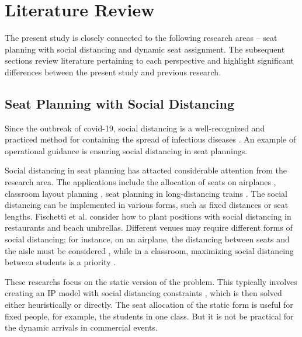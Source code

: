 \section{Literature Review}

The present study is closely connected to the following research areas -- seat planning with social distancing and dynamic seat assignment. The subsequent sections review literature pertaining to each perspective and highlight significant differences between the present study and previous research.


\subsection{Seat Planning with Social Distancing}
Since the outbreak of covid-19, social distancing is a well-recognized and practiced method for containing the spread of infectious diseases \cite{moosa2020effectiveness}. An example of operational guidance is ensuring social distancing in seat plannings.

Social distancing in seat planning has attacted considerable attention from the research area. The applications include the allocation of seats on airplanes \cite{ghorbani2020model}, classroom layout planning \cite{bortolete2022support}, seat planning in long-distancing trains \cite{haque2022optimization}. The social distancing can be implemented in various forms, such as fixed distances or seat lengths. Fischetti et al.\cite{fischetti2021safe} consider how to plant positions with social distancing in restaurants and beach umbrellas. Different venues may require different forms of social distancing; for instance, on an airplane, the distancing between seats and the aisle must be considered \cite{salari2022social}, while in a classroom, maximizing social distancing between students is a priority \cite{bortolete2022support}.

These researchs focus on the static version of the problem. This typically involves creating an IP model with social distancing constraints \cite{bortolete2022support, ghorbani2020model, haque2022optimization}, which is then solved either heuristically or directly. The seat allocation of the static form is useful for fixed people, for example, the students in one class. But it is not be practical for the dynamic arrivals in commercial events.




